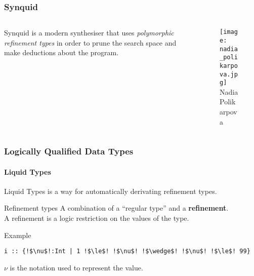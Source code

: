 \documentclass{beamer}
\makeatletter
\newcommand{\hl}{\textcolor{fibeamer@darkColor1}}
\makeatother
\begin{document}
\begin{frame}
	\frametitle{\textbf{Synquid} \cite{polikarpova_program_2016}}

	\begin{columns}[c] %
		\begin{column}{.48\textwidth}
			Synquid is a modern synthesiser that uses \textit{polymorphic refinement types}
			in order to prune the search space and make deductions about the program.
		\end{column}%
		\begin{column}{.48\textwidth}%
			\begin{figure}
				\texttt{[image: nadia\_polikarpova.jpg]}\\
				Nadia Polikarpova
			\end{figure}


		\end{column}%
	\end{columns}

\end{frame}

%

\begin{frame}[fragile]
	\frametitle{Logically Qualified Data Types}
	\framesubtitle{Liquid Types \cite{rondon_liquid_2008}}

	Liquid Types is a way for automatically derivating \hl{refinement types}.

	\begin{block}{Refinement types}
		A combination of a ``regular type'' and a \textbf{refinement}.\\
		A refinement is a logic restriction on the values of the type.\\
	\end{block}

	\pause

	\begin{exampleblock}{Example}
		\vspace*{-.2\baselineskip}
		\begin{lstlisting}[escapechar=!,style=synquid]
i :: {!$\nu$!:Int | 1 !$\le$! !$\nu$! !$\wedge$! !$\nu$! !$\le$! 99}
		\end{lstlisting}
	\end{exampleblock}
	$\nu$ is the notation used to represent the value.
\end{frame}
\end{document}
